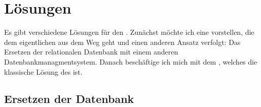 \chapter{Lösungen}

Es gibt verschiedene Lösungen für den \IM. Zunächst möchte ich eine vorstellen, die dem eigentlichen \IM aus dem Weg geht und einen anderen Ansatz verfolgt: Das Ersetzen der relationalen Datenbank mit einem anderen Datenbankmanagmentsystem. Danach beschäftige ich mich mit dem %
, welches die klassische Lösung des \IM ist.

\section{Ersetzen der Datenbank}

